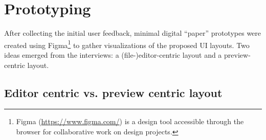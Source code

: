 
%
\chapter{Prototyping}
\label{chap:prototyping} 

After collecting the initial user feedback, minimal digital ``paper'' prototypes were created using Figma\footnote{Figma (\url{https://www.figma.com/}) is a design tool accessible through the browser for collaborative work on design projects.} to gather visualizations of the proposed UI layouts.
Two ideas emerged from the interviews: a (file-)editor-centric layout and a preview-centric layout.
\section{Editor centric vs. preview centric layout}

